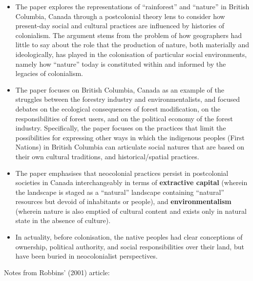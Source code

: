 \documentclass[a4paper, 10.5pt]{article} %
\begin{document}
\begin{itemize}
  \item The paper explores the representations of \enquote{rainforest} and \enquote{nature} in British Columbia, Canada through a postcolonial theory lens to consider how present-day social and cultural practices are influenced by histories of colonialism. The argument stems from the problem of how geographers had little to say about the role that the production of nature, both materially and ideologically, has played in the colonisation of particular social environments, namely how \enquote{nature} today is constituted within and informed by the legacies of colonialism.
  \item The paper focuses on British Columbia, Canada as an example of the struggles between the forestry industry and environmentalists, and focused debates on the ecological consequences of forest modification, on the responsibilities of forest users, and on the political economy of the forest industry. Specifically, the paper focuses on the practices that limit the possibilities for expressing other ways in which the indigenous peoples (First Nations) in British Columbia can articulate social natures that are based on their own cultural traditions, and historical/spatial practices.
  \item The paper emphasises that neocolonial practices persist in postcolonial societies in Canada interchangeably in terms of \textbf{extractive capital} (wherein the landscape is staged as a \enquote{natural} landscape containing \enquote{natural} resources but devoid of inhabitants or people), and \textbf{environmentalism} (wherein nature is also emptied of cultural content and exists only in natural state in the absence of culture).
  \item In actuality, before colonisation, the native peoples had clear conceptions of ownership, political authority, and social responsibilities over their land, but have been buried in neocolonialist perspectives.
\end{itemize}

\vspace{10pt}

Notes from Robbins' (2001) article:
\end{document}
